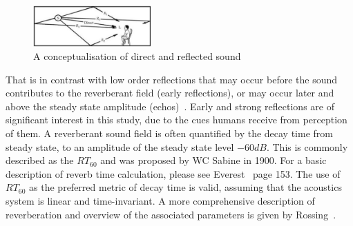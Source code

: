 \documentclass[paper=a4, fontsize=10pt, font=arial]{scrartcl} %
\numberwithin{equation}{section} %
\numberwithin{figure}{section} %
\numberwithin{table}{section} %
\begin{document}
\begin{figure}[H]
\centering
\includegraphics[width=0.4\textwidth]{reflection_diagran.jpg}
\centering
\caption{A conceptualisation of direct and reflected sound~\cite{Everest2009}}
\end{figure}

That is in contrast with low order reflections that may occur before the sound contributes to the reverberant field (early reflections), or may occur later and above the steady state amplitude (echos)~\cite{Everest2009}. 
Early and strong reflections are of significant interest in this study, due to the cues humans receive from perception of them. 
A reverberant sound field is often quantified by the decay time from steady state, to an amplitude of the steady state level $-60{dB}$. This is commonly described as the $RT_{60}$ and was proposed by WC Sabine in 1900. For a basic description of reverb time calculation, please see Everest~\cite{Everest2009} page 153.
The use of $RT_{60}$ as the preferred metric of decay time is valid, assuming that the acoustics system is linear and time-invariant.
A more comprehensive description of reverberation and overview of the associated parameters is given by Rossing~\cite{rossing2007springer}. 
\end{document}
